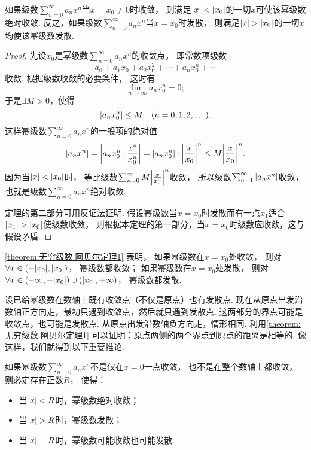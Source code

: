 \begin{theorem}[阿贝尔第一定理]\label{theorem:无穷级数.阿贝尔定理1}
如果级数\(\sum_{n=0}^\infty a_n x^n\)当\(x=x_0\neq0\)时收敛，
则满足\(\abs{x}<\abs{x_0}\)的一切\(x\)可使该幂级数绝对收敛.
反之，如果级数\(\sum_{n=0}^\infty a_n x^n\)当\(x=x_0\)时发散，
则满足\(\abs{x}>\abs{x_0}\)的一切\(x\)均使该幂级数发散.
\begin{proof}
先设\(x_0\)是幂级数\(\sum_{n=0}^\infty a_n x^n\)的收敛点，
即常数项级数\[
	a_0 + a_1 x_0 + a_2 x_0^2 + \dotsb + a_n x_0^n + \dotsb
\]收敛.
根据级数收敛的必要条件，
这时有\[
	\lim_{n\to\infty} a_n x_0^n = 0;
\]
于是\(\exists M > 0\)，使得\[
	\abs{a_n x_0^n} \leq M
	\quad(n=0,1,2,\dotsc).
\]
这样幂级数\(\sum_{n=0}^\infty a_n x^n\)的一般项的绝对值\[
	\abs{a_n x^n} = \abs{a_n x_0^n \cdot \frac{x^n}{x_0^n}}
	= \abs{a_n x_0^n} \cdot \abs{\frac{x}{x_0}}^n
	\leq M \abs{\frac{x}{x_0}}^n.
\]
因为当\(\abs{x}<\abs{x_0}\)时，
等比级数\(\sum_{n=0}^\infty M \abs{\frac{x}{x_0}}^n\)收敛，
所以级数\(\sum_{n=1}^\infty \abs{a_n x^n}\)收敛，
也就是级数\(\sum_{n=0}^\infty a_n x^n\)绝对收敛.

定理的第二部分可用反证法证明.
假设幂级数当\(x=x_0\)时发散而有一点\(x_1\)适合\(\abs{x_1}>\abs{x_0}\)使级数收敛，
则根据本定理的第一部分，当\(x=x_0\)时级数应收敛，这与假设矛盾.
\end{proof}
\end{theorem}

\cref{theorem:无穷级数.阿贝尔定理1} 表明，
如果幂级数在\(x=x_0\)处收敛，
则对\(\forall x\in(-\abs{x_0},\abs{x_0})\)，
幂级数都收敛；
如果幂级数在\(x=x_0\)处发散，
则对\(\forall x\in(-\infty,-\abs{x_0})\cup(\abs{x_0},+\infty)\)，
幂级数都发散.

设已给幂级数在数轴上既有收敛点（不仅是原点）也有发散点.
现在从原点出发沿数轴正方向走，最初只遇到收敛点，然后就只遇到发散点.
这两部分的界点可能是收敛点，也可能是发散点.
从原点出发沿数轴负方向走，情形相同.
利用\cref{theorem:无穷级数.阿贝尔定理1} 可以证明：原点两侧的两个界点到原点的距离是相等的.
像这样，我们就得到以下重要推论.
\begin{corollary}\label{theorem:无穷级数.阿贝尔定理1推论}
如果幂级数\(\sum_{n=0}^\infty a_n x^n\)不是仅在\(x=0\)一点收敛，
也不是在整个数轴上都收敛，
则必定存在正数\(R\)，
使得：\begin{itemize}
	\item 当\(\abs{x}<R\)时，幂级数绝对收敛；
	\item 当\(\abs{x}>R\)时，幂级数发散；
	\item 当\(\abs{x}=R\)时，幂级数可能收敛也可能发散.
\end{itemize}
\end{corollary}

